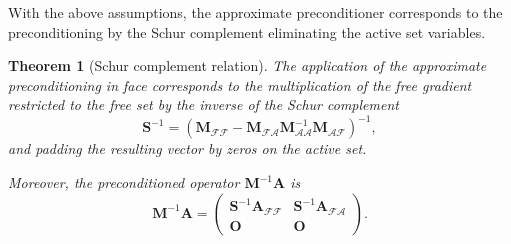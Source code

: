 \documentclass[11pt]{article}
\theoremstyle{plain}
\newtheorem{theorem}{Theorem}[section]
\theoremstyle{definition}
\newcommand{\MA}{\bm{A}}
\newcommand{\MM}{\bm{M}}
\newcommand{\MO}{\bm{O}}
\newcommand{\MS}{\bm{S}}
\begin{document}
With the above assumptions, the approximate preconditioner corresponds to the preconditioning by the Schur complement eliminating the active set variables.
\begin{theorem}[Schur complement relation]
  \label{theo:schur}
The application of the approximate preconditioning in face corresponds to the multiplication of the free gradient restricted to the free set by the inverse of the Schur complement
\begin{equation*}
\bm{S}^{-1} = (\MM_{\mathcal{F}\mathcal{F}} - \MM_{\mathcal{F}\mathcal{A}} \MM_{\mathcal{A}\mathcal{A}}^{-1} \MM_{\mathcal{A}\mathcal{F}})^{-1},
\end{equation*}
and padding the resulting vector by zeros on the active set.

Moreover, the preconditioned operator $\MM^{-1}\MA$ is
\begin{equation}
  \label{eq:precondop}
  \MM^{-1}\MA = \begin{pmatrix}
  \bm{S}^{-1}\MA_{\mathcal{F}\mathcal{F}} & \MS^{-1}\MA_{\mathcal{FA}}\\
  \MO & \MO
\end{pmatrix}.
\end{equation}

\end{theorem}
\end{document}
